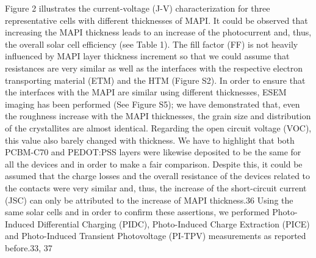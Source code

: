 Figure 2 illustrates the current-voltage (J-V) characterization for three representative cells with different thicknesses of MAPI. It could be observed that increasing the MAPI thickness leads to an increase of the photocurrent and, thus, the overall solar cell efficiency (see Table 1). The fill factor (FF) is not heavily influenced by MAPI layer thickness increment so that we could assume that resistances are very similar as well as the interfaces with the respective electron transporting material (ETM) and the HTM (Figure S2). In order to ensure that the interfaces with the MAPI are similar using different thicknesses, ESEM imaging has been performed (See Figure S5); we have demonstrated that, even the roughness increase with the MAPI thicknesses, the grain size and distribution of the crystallites are almost identical.
Regarding the open circuit voltage (VOC), this value also barely changed with thickness. We have to highlight that both PCBM-C70 and PEDOT:PSS layers were likewise deposited to be the same for all the devices and in order to make a fair comparison. Despite this, it could be assumed that the charge losses and the overall resistance of the devices related to the contacts were very similar and, thus, the increase of the short-circuit current (JSC) can only be attributed to the increase of MAPI thickness.36 Using the same solar cells and in order to confirm these assertions, we performed Photo-Induced Differential Charging (PIDC), Photo-Induced Charge Extraction (PICE) and Photo-Induced Transient Photovoltage (PI-TPV) measurements as reported before.33, 37

